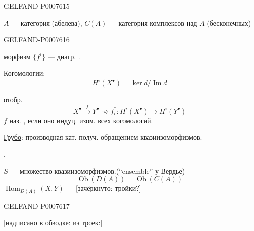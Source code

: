 \begin{GelfandAdjacentEvidence}{GELFAND-P000761}{5}


\(A\) --- категория (абелева),
\(C(A)\) --- категория комплексов над \(A\) (бесконечных)

\end{GelfandAdjacentEvidence}
\begin{GelfandAdjacentEvidence}{GELFAND-P000761}{6}

морфизм \(\{f^i\}\) --- диагр. .

Когомологии:
\[
H^i(X^\bullet)=\ker d/\operatorname{Im}d
\]

отобр.
\[
X^\bullet\xrightarrow{f}Y^\bullet
\rightsquigarrow f_i^*:H^i(X^\bullet)\longrightarrow H^i(Y^\bullet)
\]
\(f\) наз. , если оно индуц. изом. всех когомологий.

\underline{Грубо}: производная кат. получ. обращением квазиизоморфизмов.

.

\(S\) --- множество квазиизоморфизмов.\qquad (“ensemble” у Вердье)
\[
\operatorname{Ob}(D(A))=\operatorname{Ob}(C(A))
\]
\(\operatorname{Hom}_{D(A)}(X,Y)\) ---
[зачёркнуто: тройки?]
\end{GelfandAdjacentEvidence}
\begin{GelfandAdjacentEvidence}{GELFAND-P000761}{7}

[надписано в обводке: из троек:]
\end{GelfandAdjacentEvidence}



